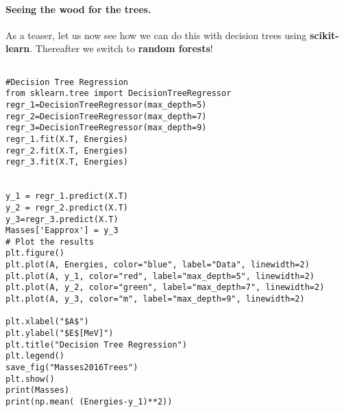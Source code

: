 \documentclass[%
oneside,                 %
final,                   %
10pt]{article}
\begin{document}
\paragraph{Seeing the wood for the trees.}
As a teaser, let us now see how we can do this with decision trees using \textbf{scikit-learn}. Thereafter we switch to \textbf{random forests}!


\begin{verbatim}

#Decision Tree Regression
from sklearn.tree import DecisionTreeRegressor
regr_1=DecisionTreeRegressor(max_depth=5)
regr_2=DecisionTreeRegressor(max_depth=7)
regr_3=DecisionTreeRegressor(max_depth=9)
regr_1.fit(X.T, Energies)
regr_2.fit(X.T, Energies)
regr_3.fit(X.T, Energies)


y_1 = regr_1.predict(X.T)
y_2 = regr_2.predict(X.T)
y_3=regr_3.predict(X.T)
Masses['Eapprox'] = y_3
# Plot the results
plt.figure()
plt.plot(A, Energies, color="blue", label="Data", linewidth=2)
plt.plot(A, y_1, color="red", label="max_depth=5", linewidth=2)
plt.plot(A, y_2, color="green", label="max_depth=7", linewidth=2)
plt.plot(A, y_3, color="m", label="max_depth=9", linewidth=2)

plt.xlabel("$A$")
plt.ylabel("$E$[MeV]")
plt.title("Decision Tree Regression")
plt.legend()
save_fig("Masses2016Trees")
plt.show()
print(Masses)
print(np.mean( (Energies-y_1)**2))
\end{verbatim}
\end{document}
